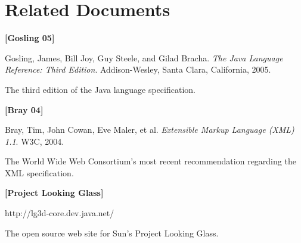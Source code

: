\documentclass[letterpaper, titlepage, 11pt]{article}
\begin{document}
\section{Related Documents}
\begin{list}{}{
\setlength{\parsep}{1ex}
\setlength{\leftmargin}{0.5in}
\setlength{\itemindent}{-0.5in}
}

\item[] \textbf{[Gosling 05]}

	Gosling, James, Bill Joy, Guy Steele, and Gilad Bracha. \textit{The Java
	Language Reference: Third Edition}. Addison-Wesley, Santa Clara, California, 2005.

	The third edition of the Java language specification.

\item[] \textbf{[Bray 04]}

	Bray, Tim, John Cowan, Eve Maler, et al. \textit{Extensible Markup
	Language (XML) 1.1}. W3C, 2004.

	The World Wide Web Consortium's most recent recommendation regarding the
	XML specification.

\item[] \textbf{[Project Looking Glass]}

	http://lg3d-core.dev.java.net/

	The open source web site for Sun's Project Looking Glass.
\end{list}
\end{document}
